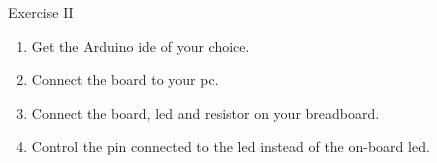 \begin{frame}
    \begin{exampleblock}{Exercise II}
        \begin{enumerate}
            \item Get the Arduino\textregistered{} \acs{ide} of your choice.
            \item Connect the board to your \acs{pc}.
            \item Connect the board, \acs{led} and resistor on your breadboard.
            \item Control the pin connected to the \acs{led} instead of the on-board \acs{led}.
        \end{enumerate}
    \end{exampleblock}
\end{frame}

